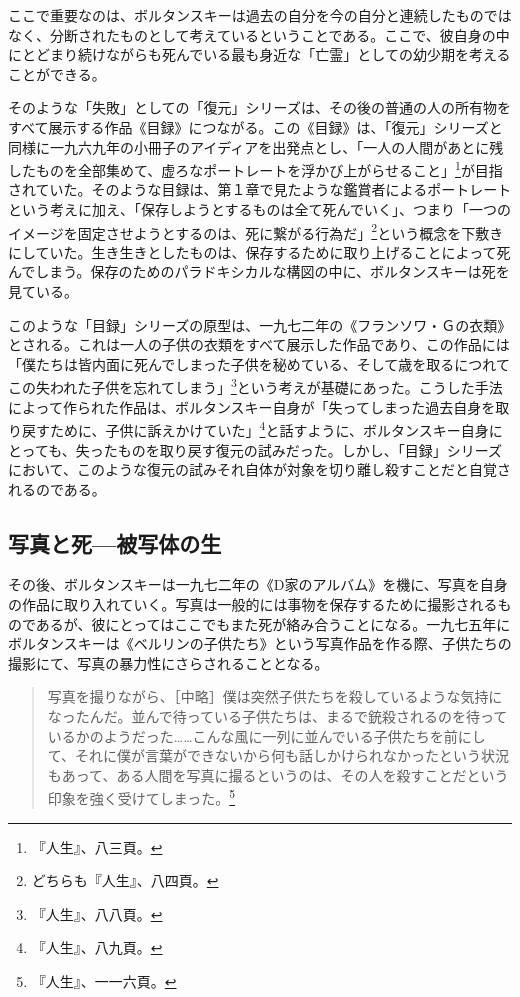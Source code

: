 \documentclass[b5j,twoside,twocolumn]{utarticle}
\newcommand{\mysubsection}[1]{\vspace{-6mm}\subsection{#1}\vspace{-2mm}}
\begin{document}
ここで重要なのは、ボルタンスキーは過去の自分を今の自分と連続したものではなく、分断されたものとして考えているということである。ここで、彼自身の中にとどまり続けながらも死んでいる最も身近な「亡霊」としての幼少期を考えることができる。


そのような「失敗」としての「復元」シリーズは、その後の普通の人の所有物をすべて展示する作品《目録》につながる。この《目録》は、「復元」シリーズと同様に一九六九年の小冊子のアイディアを出発点とし、「一人の人間があとに残したものを全部集めて、虚ろなポートレートを浮かび上がらせること」\footnote{『人生』、八三頁。}が目指されていた。そのような目録は、第１章で見たような鑑賞者によるポートレートという考えに加え、「保存しようとするものは全て死んでいく」、つまり「一つのイメージを固定させようとするのは、死に繋がる行為だ」\footnote{どちらも『人生』、八四頁。}という概念を下敷きにしていた。生き生きとしたものは、保存するために取り上げることによって死んでしまう。保存のためのパラドキシカルな構図の中に、ボルタンスキーは死を見ている。


このような「目録」シリーズの原型は、一九七二年の《フランソワ・Ｇの衣類》とされる。これは一人の子供の衣類をすべて展示した作品であり、この作品には「僕たちは皆内面に死んでしまった子供を秘めている、そして歳を取るにつれてこの失われた子供を忘れてしまう」\footnote{『人生』、八八頁。}という考えが基礎にあった。こうした手法によって作られた作品は、ボルタンスキー自身が「失ってしまった過去自身を取り戻すために、子供に訴えかけていた」\footnote{『人生』、八九頁。}と話すように、ボルタンスキー自身にとっても、失ったものを取り戻す復元の試みだった。しかし、「目録」シリーズにおいて、このような復元の試みそれ自体が対象を切り離し殺すことだと自覚されるのである。

\mysubsection{\tbaselineshift =4.0pt 写真と死---被写体の生}
その後、ボルタンスキーは一九七二年の《D家のアルバム》を機に、写真を自身の作品に取り入れていく。写真は一般的には事物を保存するために撮影されるものであるが、彼にとってはここでもまた死が絡み合うことになる。一九七五年にボルタンスキーは《ベルリンの子供たち》という写真作品を作る際、子供たちの撮影にて、写真の暴力性にさらされることとなる。

\begin{quote}
写真を撮りながら、［中略］僕は突然子供たちを殺しているような気持になったんだ。並んで待っている子供たちは、まるで銃殺されるのを待っているかのようだった……こんな風に一列に並んでいる子供たちを前にして、それに僕が言葉ができないから何も話しかけられなかったという状況もあって、ある人間を写真に撮るというのは、その人を殺すことだという印象を強く受けてしまった。\footnote{『人生』、一一六頁。}
\end{quote}
\end{document}
